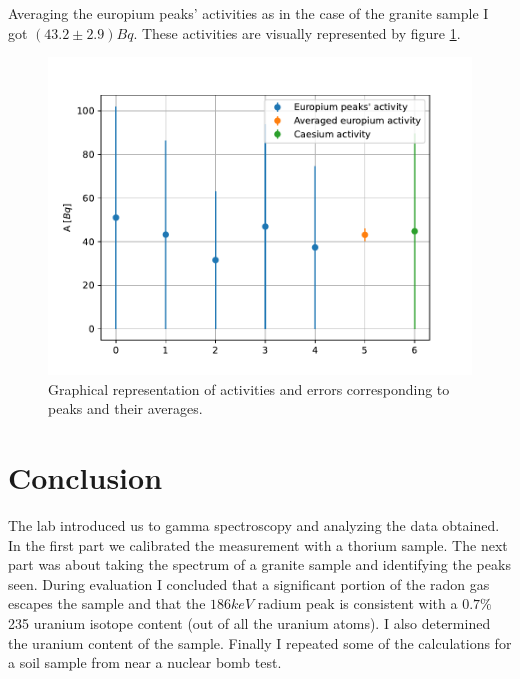\documentclass[pdftex,12pt,a4paper]{article}
\begin{document}
		Averaging the europium peaks' activities as in the case of the granite sample I got $(43.2\pm 2.9)Bq$. These activities are visually represented by figure \ref{soilaveragesfig}.
			\begin{figure}[H]
			\centering
			\includegraphics[scale=1]{./figs/soilactivities.pdf}
			\caption{Graphical representation of activities and errors corresponding to peaks and their averages.}
			\label{soilaveragesfig}
		\end{figure}
	\section{Conclusion}
		The lab introduced us to gamma spectroscopy and analyzing the data obtained. In the first part we calibrated the measurement with a thorium sample. The next part was about taking the spectrum of a granite sample and identifying the peaks seen. During evaluation I concluded that a significant portion of the radon gas escapes the sample and that the $186keV$ radium peak is consistent with a $0.7\%$ 235 uranium isotope content (out of all the uranium atoms). I also determined the uranium content of the sample. Finally I repeated some of the calculations for a soil sample from near a nuclear bomb test.
	
\end{document}
